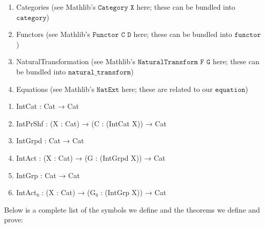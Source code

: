 \documentclass{book}
\theoremstyle{definition}
\begin{document}
\newpage

\begin{enumerate}
\item Categories (see Mathlib's $\texttt{Category X}$ here; these can be bundled into $\texttt{category}$)
\item Functors (see Mathlib's $\texttt{Functor C D}$ here; these can be bundled into $\texttt{functor}$)
\item NaturalTransformation (see Mathlib's $\texttt{NaturalTransform F G}$ here; these can be bundled into $\texttt{natural\_transform}$)
\item Equations (see Mathlib's $\texttt{NatExt}$ here; these are related to our $\texttt{equation}$)
\end{enumerate}

\begin{enumerate}
\item IntCat : Cat → Cat 
\item IntPrShf : (X : Cat) → (C : (IntCat X)) → Cat
\item IntGrpd : Cat → Cat
\item IntAct : (X : Cat) → (G : (IntGrpd X)) → Cat
\item IntGrp : Cat → Cat
\item IntAct₀ : (X : Cat) → (G₀ : (IntGrp X)) → Cat
\end{enumerate} 

Below is a complete list of the symbols we define and the theorems we define and prove:
\end{document}
